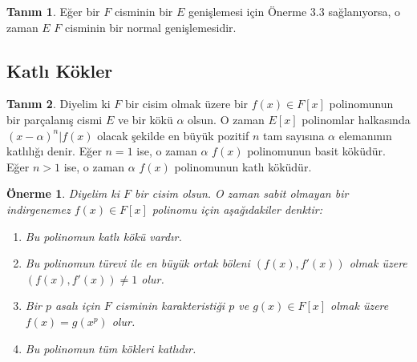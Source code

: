 \documentclass[draft]{article}
\newtheorem{prop}[thm]{Önerme}
\theoremstyle{definition}
\newtheorem{defn}{Tanım}[section]
\theoremstyle{remark}
\begin{document}
    	    \begin{defn}
    	        Eğer bir $F$ cisminin bir $E$ genişlemesi için Önerme 3.3 sağlanıyorsa, o zaman $E$ $F$ cisminin bir normal genişlemesidir.
    	    \end{defn}
	        
    	\subsection{Katlı Kökler}
    	
    	    \begin{defn}
    	        Diyelim ki $F$ bir cisim olmak üzere bir $f(x) \in F[x]$ polinomunun bir parçalanış cismi $E$ ve bir kökü $\alpha$ olsun. O zaman $E[x]$ polinomlar halkasında $(x - \alpha)^n | f(x)$ olacak şekilde en büyük pozitif $n$ tam sayısına $\alpha$ elemanının katlılığı denir. Eğer $n = 1$ ise, o zaman $\alpha$ $f(x)$ polinomunun basit köküdür. Eğer $n > 1$ ise, o zaman $\alpha$ $f(x)$ polinomunun katlı köküdür.
    	    \end{defn}
    	    
    	    \begin{prop}
    	        Diyelim ki $F$ bir cisim olsun. O zaman sabit olmayan bir indirgenemez $f(x) \in F[x]$ polinomu için aşağıdakiler denktir:
    	        \begin{enumerate}
				\renewcommand{\labelenumi}{(\roman{enumi})}
				    \item Bu polinomun katlı kökü vardır.
				    \item Bu polinomun türevi ile en büyük ortak böleni $(f(x), f'(x))$ olmak üzere $(f(x), f'(x)) \neq 1$ olur.
				    \item Bir $p$ asalı için $F$ cisminin karakteristiği $p$ ve $g(x) \in F[x]$ olmak üzere $f(x) = g(x^p)$ olur.
				    \item Bu polinomun tüm kökleri katlıdır.
				\end{enumerate}
    	    \end{prop}
    	    
\end{document}
